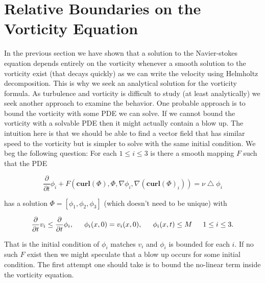 \documentclass[amsmath,12pt,a4paper]{amsart}
\begin{document}
\section{Relative Boundaries on the Vorticity Equation}
In the previous section we have shown that a solution to the Navier-stokes equation depends entirely on the vorticity whenever a smooth solution to the vorticity exist (that decays quickly) as we can write the velocity using Helmholtz decomposition. This is why we seek an analytical solution for the vorticity formula. As turbulence and vorticity is difficult to study (at least analytically) we seek another approach to examine the behavior. One probable approach is to bound the vorticity with some PDE we can solve. If we cannot bound the vorticity with a solvable PDE then it might actually contain a blow up. The intuition here is that we should be able to find a vector field that has similar speed to the vorticity but is simpler to solve with the same initial condition. We beg the following question: For each $1\le i\le 3$ is there a smooth mapping $F$ such that the PDE

\begin{equation}\label{Eq20}
\dfrac{\partial}{\partial t}\phi_i + F(\textbf{curl}(\Phi), \Phi, \nabla \phi_i, \nabla (\textbf{curl}(\Phi)_i)) = \nu\bigtriangleup \phi_i 
\end{equation}

has a solution $\Phi = [\phi_1,\phi_2,\phi_3]$ (which doesn't need to be unique) with

\begin{equation}\label{Eq21}
\dfrac{\partial}{\partial t}v_i \le \dfrac{\partial}{\partial t}\phi_i,\indent \phi_i(x,0) = v_i(x,0), \indent \phi_i(x,t)\le M  \indent 1\le i\le 3.
\end{equation}

That is the initial condition of $\phi_i$ matches $v_i$ and $\phi_i$ is bounded for each $i$. If no such $F$ exist then we might speculate that a blow up occurs for some initial condition. The first attempt one should take is to bound the no-linear term inside the vorticity equation. 
\end{document}
